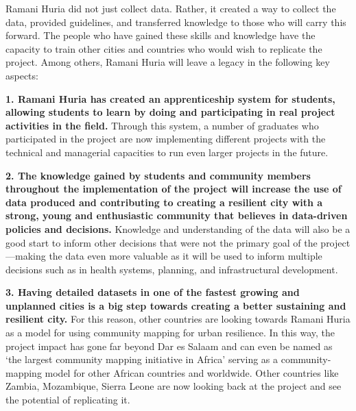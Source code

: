 \documentclass[a4paper,12pt,twoside]{article}
\begin{document}
\begin{multicols}{2}
Ramani Huria did not just collect data. Rather, it created a way to collect the data, provided guidelines, and transferred knowledge to those who will carry this forward. The people who have gained these skills and knowledge have the capacity to train other cities and countries who would wish to replicate the project. Among others, Ramani Huria will leave a legacy in the following key aspects:

   \textbf{ 1. Ramani Huria has created an apprenticeship system for students, allowing students to learn by doing and participating in real project activities in the field.} Through this system, a number of graduates who participated in the project are now implementing different projects with the technical and managerial capacities to run even larger projects in the future.
    
   \textbf{ 2. The knowledge gained by students and community members throughout the implementation of the project will increase the use of data produced and contributing to creating a resilient city with a strong, young and enthusiastic community that believes in data-driven policies and decisions.} Knowledge and understanding of the data will also be a good start to inform other decisions that were not the primary goal of the project---making the data even more valuable as it will be used to inform multiple decisions such as in health systems, planning, and infrastructural development.
    
    \textbf{3. Having detailed datasets in one of the fastest growing and unplanned cities is a big step towards creating a better sustaining and resilient city.} For this reason, other countries are looking towards Ramani Huria as a model for using community mapping for urban resilience. In this way, the project impact has gone far beyond Dar es Salaam and can even be named as  ‘the largest community mapping initiative in Africa’ serving as a community-mapping model for other African countries and worldwide. Other countries like Zambia, Mozambique, Sierra Leone are now looking back at the project and see the potential of replicating it.
    \end{multicols}
\end{document}
